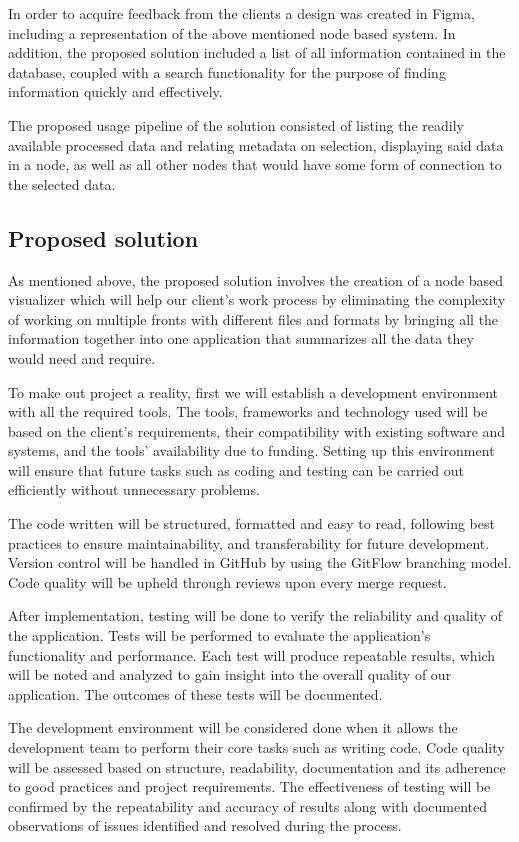 In order to acquire feedback from the clients a design was created in Figma, including a representation of the above mentioned node based system. In addition, the proposed solution included a list of all information contained in the database, coupled with a search functionality for the purpose of finding information quickly and effectively.

The proposed usage pipeline of the solution consisted of listing the readily available processed data and relating metadata on selection, displaying said data in a node, as well as all other nodes that would have some form of connection to the selected data.


\subsection{Proposed solution}
\label{subsec:Proposed solution}
As mentioned above, the proposed solution involves the creation of a node based visualizer which will help our client's work process by eliminating the complexity of working on multiple fronts with different files and formats by bringing all the information together into one application that summarizes all the data they would need and require.

To make out project a reality, first we will establish a development environment with all the required tools. The tools, frameworks and technology used will be based on the client's requirements, their compatibility with existing software and systems, and the tools' availability due to funding. Setting up this environment will ensure that future tasks such as coding and testing can be carried out efficiently without unnecessary problems.

The code written will be structured, formatted and easy to read, following best practices to ensure maintainability, and transferability for future development. Version control will be handled in GitHub by using the GitFlow branching model. Code quality will be upheld through reviews upon every merge request.

After implementation, testing will be done to verify the reliability and quality of the application. Tests will be performed to evaluate the application's functionality and performance. Each test will produce repeatable results, which will be noted and analyzed to gain insight into the overall quality of our application. The outcomes of these tests will be documented.

The development environment will be considered done when it allows the development team to perform their core tasks such as writing code. Code quality will be assessed based on structure, readability, documentation and its adherence to good practices and project requirements. The effectiveness of testing will be confirmed by the repeatability and accuracy of results along with documented observations of issues identified and resolved during the process.

